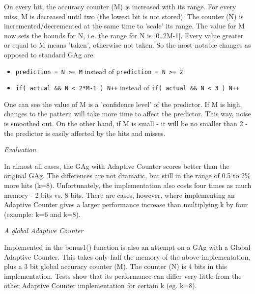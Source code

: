 \documentclass[a4paper]{article}
\begin{document}
On every hit, the accuracy counter (M) is increased with its range. For every miss,
M is decreased until two (the lowest bit is not stored).
The counter (N) is incremented/decremented at the same
time to 'scale' its range. The value for M now sets the bounds for N, i.e. the range
for N is {[}0..2M-1{]}. Every value greater or equal to M means 'taken', otherwise not taken.
So the most notable changes as opposed to standard GAg are:
%
\begin{itemize}

\item \texttt{prediction = N >= M} instead of \texttt{prediction = N >= 2}

\item \texttt{if( actual \&\& N < 2*M-1 ) N++} instead of \texttt{if( actual \&\& N < 3 ) N++}

\end{itemize}

One can see the value of M is a 'confidence level' of the predictor. If M is
high, changes to the pattern will take more time to affect the predictor. This
way, noise is smoothed out. On the other hand, if M is small - it will be no smaller than 2 -
the predictor is easily affected by the hits and misses.

\emph{Evaluation}

In almost all cases, the GAg with Adaptive Counter scores better than the original GAg.
The differences are not dramatic, but still in the range of 0.5 to 2\% more hits (k=8).
Unfortunately, the implementation also costs four times as much memory - 2 bits
vs. 8 bits. There are cases, however, where implementing an Adaptive Counter gives a
larger performance increase than multiplying k by four (example: k=6 and k=8).

\emph{A global Adaptive Counter}

Implemented in the bonus1() function is also an attempt on a GAg with a Global Adaptive Counter.
This takes only half the memory of the above implementation, plus a 3 bit global accuracy counter (M).
The counter (N) is 4 bits in this implementation. Tests show that its performance can differ
very little from the other Adaptive Counter implementation for certain k (eg. k=8).
\end{document}
